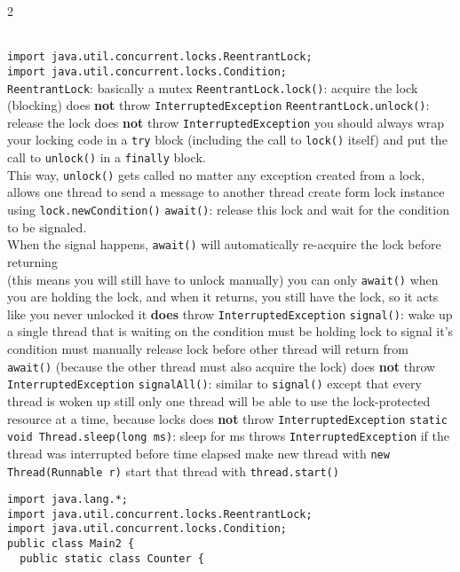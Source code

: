 \documentclass{article}
\def \columncount {2}
\newcommand{\codesize}{8.5}
\newcommand{\java}[1]{{\fontsize{\codesize}{\codesize}\selectfont\texttt{#1}}}
\begin{document}
\begin{multicols}{\columncount}
\begin{outline}[longenum]
\\\java{import java.util.concurrent.locks.ReentrantLock;}
\\\java{import java.util.concurrent.locks.Condition;}
\\\zzz{\java{ReentrantLock}}
  \1 \java{ReentrantLock}: basically a mutex
  \1 \java{ReentrantLock.lock()}: acquire the lock (blocking)
    \2 does \textbf{not} throw \java{InterruptedException}
  \1 \java{ReentrantLock.unlock()}: release the lock
    \2 does \textbf{not} throw \java{InterruptedException}
    \2 you should always wrap your locking code in a \java{try{}} block (including the call to \java{lock()} itself) and put the call to \java{unlock()} in a \java{finally{}} block.
    \\This way, \java{unlock()} gets called no matter any exception
\zzz{\java{Condition}}
  \1 created from a lock, allows one thread to send a message to another thread
    \2 create form lock instance using \java{lock.newCondition()}
  \1 \java{await()}: release this lock and wait for the condition to be signaled.
    \\ When the signal happens, \java{await()} will automatically re-acquire the lock before returning
    \\ (this means you will still have to unlock manually)
    \2 you can only \java{await()} when you are holding the lock, and when it returns, you still have the lock, so it acts like you never unlocked it
    \2 \textbf{does} throw \java{InterruptedException}
  \1 \java{signal()}: wake up a single thread that is waiting on the condition
    \2 must be holding lock to signal it's condition
    \2 must manually release lock before other thread will return from \java{await()} (because the other thread must also acquire the lock)
    \2 does \textbf{not} throw \java{InterruptedException}
  \1 \java{signalAll()}: similar to \java{signal()} except that every thread is woken up
    \2 still only one thread will be able to use the lock-protected resource at a time, because locks
    \2 does \textbf{not} throw \java{InterruptedException}
  \1 \java{static void Thread.sleep(long ms)}: sleep for ms
    \2 throws \java{InterruptedException} if the thread was interrupted before time elapsed
  \1 make new thread with \java{new Thread(Runnable r)}
    \2 start that thread with \java{thread.start()}
\0
\begin{verbatim}
import java.lang.*;
import java.util.concurrent.locks.ReentrantLock;
import java.util.concurrent.locks.Condition;
public class Main2 {
  public static class Counter {

\end{verbatim}
\end{outline}
\end{multicols}
\end{document}
